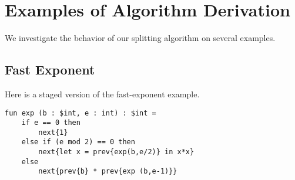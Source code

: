 
\section{Examples of Algorithm Derivation}
\label{sec:examples}

We investigate the behavior of our splitting algorithm on several examples.

 







\subsection{Fast Exponent}

Here is a staged version of the fast-exponent example.
\begin{lstlisting} 
fun exp (b : $int, e : int) : $int =
	if e == 0 then
		next{1}
	else if (e mod 2) == 0 then
		next{let x = prev{exp(b,e/2)} in x*x}
	else
		next{prev{b} * prev{exp (b,e-1)}}
\end{lstlisting}


